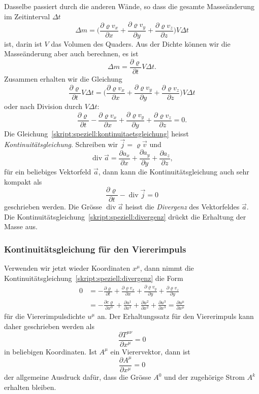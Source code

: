 Dasselbe passiert durch die anderen Wände, so dass
die gesamte Masseänderung im Zeitinterval $\Delta t$
\[
\Delta m
=
\biggl(
\frac{\partial\varrho v_x}{\partial x}
+
\frac{\partial\varrho v_y}{\partial y}
+
\frac{\partial\varrho v_z}{\partial z}
\biggr)V\Delta t
\]
ist, darin ist $V$ das Volumen des Quaders.
Aus der Dichte können wir die Masseänderung aber auch berechnen,
es ist
\[
\Delta m
=
\frac{\partial\varrho}{\partial t}V \Delta t.
\]
Zusammen erhalten wir die Gleichung
\[
\frac{\partial\varrho}{\partial t}V \Delta t
=
\biggl(
\frac{\partial \varrho v_x}{\partial x}
+
\frac{\partial \varrho v_y}{\partial y}
+
\frac{\partial \varrho v_z}{\partial z}
\biggr)V\Delta t
\]
oder nach Division durch $V\Delta t$:
\begin{equation}
\frac{\partial\varrho}{\partial t}
-
\frac{\partial \varrho v_x}{\partial x}
+
\frac{\partial \varrho v_y}{\partial y}
+
\frac{\partial \varrho v_z}{\partial z}
=0.
\label{skript:speziell:kontinuitaetsgleichung}
\end{equation}
Die Gleichung~\eqref{skript:speziell:kontinuitaetsgleichung} heisst
{\em Kontinuitätsgleichung}.
Schreiben wir $\vec j = \varrho\vec v$ und
\begin{equation}
\operatorname{div}\vec a
=
\frac{\partial a_x}{\partial x}
+
\frac{\partial a_y}{\partial y}
+
\frac{\partial a_z}{\partial z},
\label{skript:speziell:divergenz}
\end{equation}
für ein beliebiges Vektorfeld $\vec a$,
dann kann die Kontinuitätsgleichung auch sehr kompakt als
\[
\frac{\partial\varrho}{\partial t}-\operatorname{div}\vec j=0
\]
geschrieben werden.
Die Grösse $\operatorname{div}\vec a$ heisst die {\em Divergenz}
des Vektorfeldes $\vec a$.
Die Kontinuitätsgleichung~\eqref{skript:speziell:divergenz} drückt
die Erhaltung der Masse aus.

\subsubsection{Kontinuitätsgleichung für den Viererimpuls}
Verwenden wir jetzt wieder Koordinaten $x^\mu$, dann nimmt die
Kontinuitätsgleichung~\eqref{skript:speziell:divergenz}
die Form
\begin{align*}
0
&=
-
\frac{\partial \varrho}{\partial t}
+
\frac{\partial \varrho v_x}{\partial x}
+
\frac{\partial \varrho v_y}{\partial y}
+
\frac{\partial \varrho v_z}{\partial y}
\\
&=
-\frac{\partial c \varrho}{\partial x^0}
+\frac{\partial u^1}{\partial x^1}
+\frac{\partial u^2}{\partial x^2}
+\frac{\partial u^3}{\partial x^3}
=
\frac{\partial u^\mu}{\partial x^\mu}
\end{align*}
für die Viererimpulsdichte $u^\mu$ an.
%
%
Der Erhaltungssatz für den Viererimpuls kann daher
geschrieben werden als
\begin{equation}
\frac{\partial T^{\mu\nu}}{\partial x^\mu}
=0
\label{skript:speziell:energieerhaltung}
\end{equation}
in beliebigen Koordinaten.
Ist $A^{\mu}$ ein Vierervektor, dann ist
\[
\frac{\partial A^\mu}{\partial x^\mu}=0
\]
der allgemeine Ausdruck dafür, dass die Grösse $A^0$ und der zugehörige
Strom $A^k$ erhalten bleiben.

